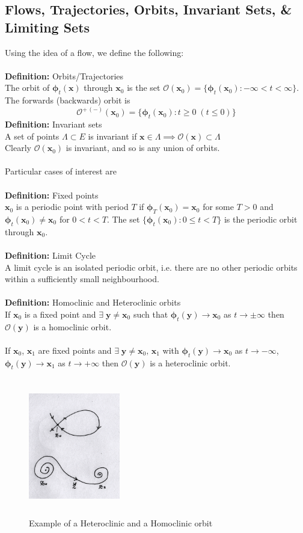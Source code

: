 \documentclass{article}
\newcommand{\cO}{\mathcal{O}} %
\newcommand{\bp}{\bm{\phi}}   %
\begin{document}
\subsection{Flows, Trajectories, Orbits, Invariant Sets, \& Limiting Sets}
Using the idea of a flow, we define the following:
\\
\\
\textbf{Definition:} Orbits/Trajectories
\\
 The orbit of $\bp_t(\bm{x})$ through $\bm{x}_0$ is
the set $\cO(\bm{x}_0) = \{ \bp_t(\bm{x}_0): -\infty < t < \infty \}$.
\\
The forwards (backwards) orbit is 
\[\cO^{+ \, (-)}(\bm{x}_0) = \{ \bp_t(\bm{x}_0):  t \geq 0 \; (t \leq 0) \} \]
\textbf{Definition:} Invariant sets
\\
A set of points $\Lambda \subset E$ is invariant if
$\bm{x} \in \Lambda \implies \cO(\bm{x}) \subset \Lambda$
\\
Clearly $\cO(\bm{x}_0)$ is invariant, and so is any union of orbits.
\\
\\
Particular cases of interest are
\\
\\
\textbf{Definition:} Fixed points
\\
$\bm{x}_0$ is a periodic point with period $T$ if $\bp_T(\bm{x}_0)= \bm{x}_0$
for some $T>0$ and $\bp_t (\bm{x}_0) \neq \bm{x}_0$ for $0 < t < T$.
The set $ \{ \bp_t ( \bm{x}_0) : 0 \leq t < T \}$ is the periodic orbit
through $\bm{x}_0$.
\\
\\
\textbf{Definition:} Limit Cycle
\\
A limit cycle is an isolated periodic orbit, i.e. there are no other periodic
orbits within a sufficiently small neighbourhood.
\\
\\
\textbf{Definition:} Homoclinic and Heteroclinic orbits
\\
If $\bm{x}_0$ is a fixed point and $\exists \; \bm{y} \neq \bm{x}_0$ such that
$\bp_t(\bm{y}) \to \bm{x}_0$ as $t \to \pm \infty$ then 
$\cO(\bm{y})$ is a homoclinic orbit.
\\
\\
If $\bm{x}_0$, $\bm{x}_1$ are fixed points and 
$\exists \; \bm{y} \neq \bm{x}_0 , \, \bm{x}_1$ with $\bp_t (\bm{y}) \to \bm{x}_0$
as $t \to - \infty$, $\bp_t(\bm{y}) \to \bm{x}_1$ as $t \to + \infty$ then
$\cO(\bm{y})$ is a heteroclinic orbit.
%
\begin{figure}[H]
\centering\caption*{Example of a Heteroclinic and a Homoclinic orbit}
\includegraphics[width=4cm, height=6cm]{fig3.png}
\end{figure}
\end{document}
